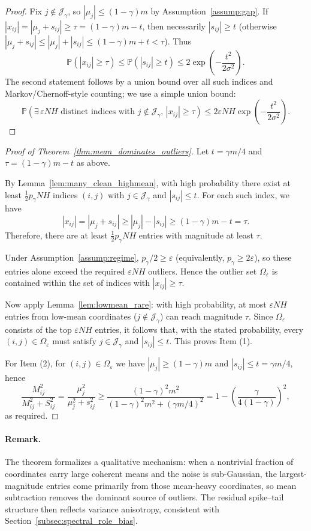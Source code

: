 \begin{proof}
Fix $j\notin\mathcal{J}_\gamma$, so $|\mu_j|\le (1-\gamma)m$ by Assumption~\ref{assump:gap}.
If $|x_{ij}|=|\mu_j+s_{ij}|\ge \tau=(1-\gamma)m-t$, then necessarily
$|s_{ij}|\ge t$ (otherwise $|\mu_j+s_{ij}|\le |\mu_j|+|s_{ij}|\le (1-\gamma)m+t < \tau$).
Thus
\[
\mathbb{P}(|x_{ij}|\ge\tau)\le \mathbb{P}(|s_{ij}|\ge t)
\le 2\exp\!\left(-\frac{t^2}{2\sigma^2}\right).
\]
The second statement follows by a union bound over all such indices and Markov/Chernoff-style counting; we use a simple union bound:
\[
\mathbb{P}\left(\exists\,\varepsilon NH \text{ distinct indices with } j\notin\mathcal{J}_\gamma,\,|x_{ij}|\ge\tau\right)
\le
2\varepsilon NH\exp\!\left(-\frac{t^2}{2\sigma^2}\right).
\]
\end{proof}

\begin{proof}[Proof of Theorem~\ref{thm:mean_dominates_outliers}]
Let $t=\gamma m/4$ and $\tau=(1-\gamma)m-t$ as above.

By Lemma~\ref{lem:many_clean_highmean}, with high probability there exist at least
$\frac{1}{2}p_\gamma NH$ indices $(i,j)$ with $j\in\mathcal{J}_\gamma$ and
$|s_{ij}|\le t$.
For each such index, we have
\[
|x_{ij}| = |\mu_j+s_{ij}|
\ge |\mu_j|-|s_{ij}|
\ge (1-\gamma)m - t
= \tau.
\]
Therefore, there are at least $\frac{1}{2}p_\gamma NH$ entries with magnitude at least $\tau$.

Under Assumption~\ref{assump:regime}, $p_\gamma/2 \ge \varepsilon$ (equivalently, $p_\gamma \ge 2\varepsilon$),
so these entries alone exceed the required $\varepsilon NH$ outliers.
Hence the outlier set $\Omega_\varepsilon$ is contained within the set of indices
with $|x_{ij}|\ge\tau$.

Now apply Lemma~\ref{lem:lowmean_rare}:
with high probability, at most $\varepsilon NH$ entries from low-mean coordinates
($j\notin\mathcal{J}_\gamma$) can reach magnitude $\tau$.
Since $\Omega_\varepsilon$ consists of the top $\varepsilon NH$ entries,
it follows that, with the stated probability, every $(i,j)\in\Omega_\varepsilon$
must satisfy $j\in\mathcal{J}_\gamma$ and $|s_{ij}|\le t$.
This proves Item (1).

For Item (2), for $(i,j)\in\Omega_\varepsilon$ we have $|\mu_j|\ge (1-\gamma)m$ and
$|s_{ij}|\le t=\gamma m/4$, hence
\[
\frac{M_{ij}^2}{M_{ij}^2 + S_{ij}^2}
=
\frac{\mu_j^2}{\mu_j^2 + s_{ij}^2}
\ge
\frac{(1-\gamma)^2m^2}{(1-\gamma)^2m^2 + (\gamma m/4)^2}
=
1 - \left(\frac{\gamma}{4(1-\gamma)}\right)^2,
\]
as required.
\end{proof}

\paragraph{Remark.}
The theorem formalizes a qualitative mechanism: when a nontrivial fraction of coordinates
carry large coherent means and the noise is sub-Gaussian, the largest-magnitude entries
come primarily from those mean-heavy coordinates, so mean subtraction removes the dominant
source of outliers. The residual spike--tail structure then reflects variance anisotropy,
consistent with Section~\ref{subsec:spectral_role_bias}.